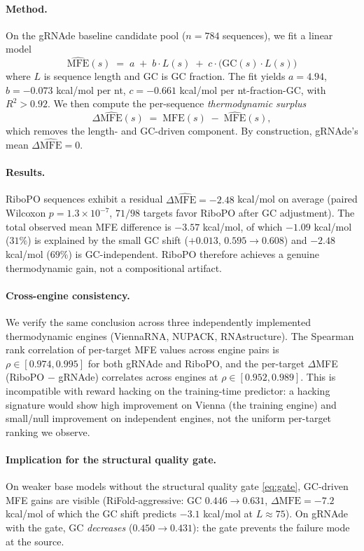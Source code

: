 {{\paragraph{Method.}
On the gRNAde baseline candidate pool ($n{=}784$ sequences), we fit a linear model
\begin{equation}
\widehat{\mathrm{MFE}}(s) \;=\; a \;+\; b\cdot L(s) \;+\; c\cdot\big(\mathrm{GC}(s)\cdot L(s)\big)
\end{equation}
where $L$ is sequence length and $\mathrm{GC}$ is GC fraction. The fit yields $a=4.94$, $b=-0.073$ kcal/mol per nt, $c=-0.661$ kcal/mol per nt-fraction-GC, with $R^2 > 0.92$. We then compute the per-sequence \emph{thermodynamic surplus}
\[
\Delta\widehat{\mathrm{MFE}}(s) \;=\; \mathrm{MFE}(s) \;-\; \widehat{\mathrm{MFE}}(s),
\]
which removes the length- and GC-driven component. By construction, gRNAde's mean $\Delta\widehat{\mathrm{MFE}}=0$.

\paragraph{Results.}
RiboPO sequences exhibit a residual $\Delta\widehat{\mathrm{MFE}} = -2.48$ kcal/mol on average (paired Wilcoxon $p = 1.3\!\times\!10^{-7}$, $71/98$ targets favor RiboPO after GC adjustment). The total observed mean MFE difference is $-3.57$ kcal/mol, of which $-1.09$ kcal/mol ($31\%$) is explained by the small GC shift ($+0.013$, $0.595{\to}0.608$) and $-2.48$ kcal/mol ($69\%$) is GC-independent. RiboPO therefore achieves a genuine thermodynamic gain, not a compositional artifact.

\paragraph{Cross-engine consistency.}
We verify the same conclusion across three independently implemented thermodynamic engines (ViennaRNA, NUPACK, RNAstructure). The Spearman rank correlation of per-target MFE values across engine pairs is $\rho \in [0.974, 0.995]$ for both gRNAde and RiboPO, and the per-target $\Delta$MFE (RiboPO $-$ gRNAde) correlates across engines at $\rho \in [0.952, 0.989]$. This is incompatible with reward hacking on the training-time predictor: a hacking signature would show high improvement on Vienna (the training engine) and small/null improvement on independent engines, not the uniform per-target ranking we observe.

\paragraph{Implication for the structural quality gate.}
On weaker base models without the structural quality gate \eqref{eq:gate}, GC-driven MFE gains are visible (RiFold-aggressive: GC $0.446 \to 0.631$, $\Delta\mathrm{MFE} = -7.2$ kcal/mol of which the GC shift predicts $-3.1$ kcal/mol at $L\approx 75$). On gRNAde with the gate, GC \emph{decreases} ($0.450 \to 0.431$): the gate prevents the failure mode at the source.

}}
